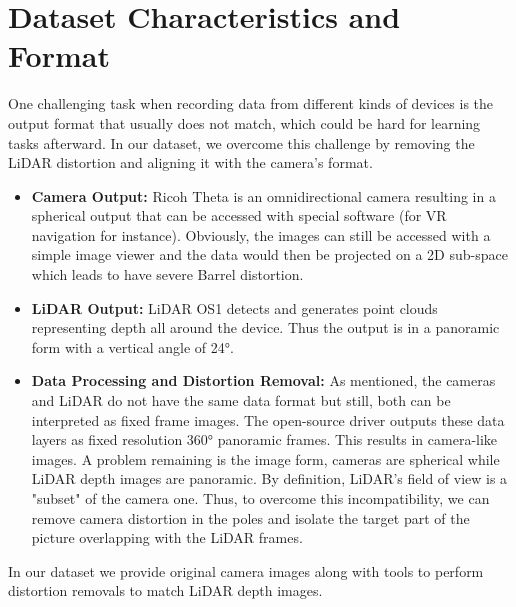 \documentclass[english, LaM, oneside]{sapthesis}%
\begin{document}
\section{Dataset Characteristics and Format}
One challenging task when recording data from different kinds of devices is the output format that usually does not match, which could be hard for learning tasks afterward. In our dataset, we overcome this challenge by removing the LiDAR distortion and aligning it with the camera's format.

\begin{itemize}
  \item{\textbf{Camera Output:}}
Ricoh Theta is an omnidirectional camera resulting in a spherical output that can be accessed with special software (for VR navigation for instance). Obviously, the images can still be accessed with a simple image viewer and the data would then be projected on a 2D sub-space which leads to have severe Barrel distortion. 

    \item{\textbf{LiDAR Output:}}
LiDAR OS1 detects and generates point clouds representing depth all around the device. Thus the output is in a panoramic form with a vertical angle of 24°.

    \item{\textbf{Data Processing and Distortion Removal:}}
As mentioned, the cameras and LiDAR do not have the same data format but still, both can be interpreted as fixed frame images. 
The open-source driver outputs these data layers as fixed resolution 360° panoramic frames. This results in camera-like images.
A problem remaining is the image form, cameras are spherical while LiDAR depth images are panoramic. By definition, LiDAR's field of view is a "subset" of the camera one. Thus, to overcome this incompatibility, we can remove camera distortion in the poles and isolate the target part of the picture overlapping with the LiDAR frames.

\end{itemize}
In our dataset we provide original camera images along with tools to perform distortion removals to match LiDAR depth images.
\end{document}
